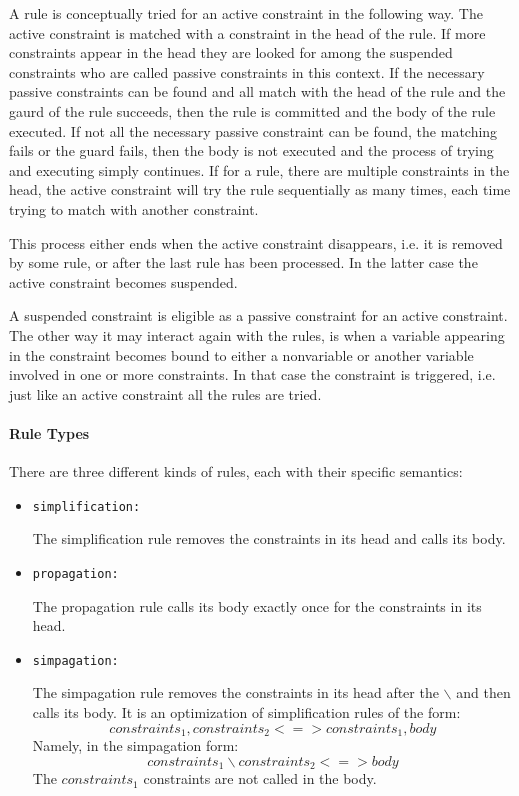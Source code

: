 A rule is conceptually tried for an active constraint in the following
way. The active constraint is matched with a constraint in the head of the
rule. If more constraints appear in the head they are looked for among the
suspended constraints who are called passive constraints in this context. If
the necessary passive constraints can be found and all match with the head of
the rule and the gaurd of the rule succeeds, then the rule is committed and
the body of the rule executed.  If not all the necessary passive constraint
can be found, the matching fails or the guard fails, then the body is not
executed and the process of trying and executing simply continues. If for
a rule, there are multiple constraints in the head, the active constraint
will try the rule sequentially as many times, each time trying to match with
another constraint.

This process either ends when the active constraint disappears, i.e. it is
removed by some rule, or after the last rule has been processed. In the latter
case the active constraint becomes suspended.

A suspended constraint is eligible as a passive constraint for an active
constraint. The other way it may interact again with the rules, is when
a variable appearing in the constraint becomes bound to either a nonvariable
or another variable involved in one or more constraints. In that case the
constraint is triggered, i.e. just like an active constraint all the rules
are tried.

\paragraph{Rule Types}
There are three different kinds of rules, each with their specific semantics:
\begin{itemize}
\item \texttt{simplification:}

The simplification rule removes the constraints in its head and calls its body.

\item \texttt{propagation:}

The propagation rule calls its body exactly once for the constraints in its head.

\item \texttt{simpagation:}

The simpagation rule removes the constraints in its head after the $\backslash$ and then calls its body.
It is an optimization of simplification rules of the form:
\[constraints_1, constraints_2 <=> constraints_1, body \]
Namely, in the simpagation form:
\[ constraints_1 \backslash constraints_2 <=> body \]
The $constraints_1$ constraints are not called in the body.

\end{itemize}

